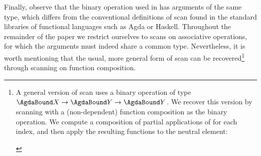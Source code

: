 Finally, observe that the binary operation  used in  has
arguments of the same type, which differs from the conventional definitions of
scan found in the standard libraries of functional languages such as Agda or
Haskell.  Throughout the remainder of the paper we restrict ourselves to scans
on associative operations, for which the arguments must indeed share a common
type.  Nevertheless, it is worth mentioning that the usual, more general form
of scan can be recovered\footnote{A general version of scan uses a binary
operation of type $\AB{X} \to \AB{Y} \to \AB{Y}$.  We recover this version by
scanning with a (non-dependent) function composition as the binary operation.
We compute a composition of partial applications of  for each index, and
then apply the resulting functions to the neutral element:
\begin{mathpar}
\end{mathpar}
} through scanning on function composition.

